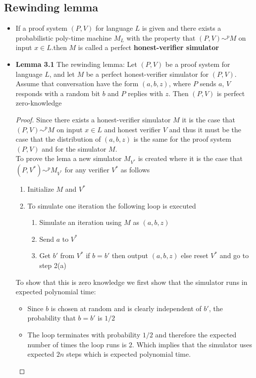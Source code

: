 \subsection{Rewinding lemma}
\begin{itemize}
  \item If a proof system $(P,V)$ for language $L$ is given and there exists a probabilistic poly-time machine $M_{L}$ with the property that $(P,V) \sim^p M$ on input $x \in L$.then $M$ is called a perfect \textbf{honest-verifier simulator}
  \item \textbf{Lemma 3.1} The rewinding lemma: Let $(P,V)$ be a proof system for language $L$, and let $M$ be a perfect honest-verifier simulator for $(P,V)$. Assume that conversation have the form $(a,b,z)$, where $P$ sends $a$, $V$ responds with a random bit $b$ and $P$ replies with $z$. Then $(P,V)$ is perfect zero-knowledge	
  \begin{proof} 
    Since there exists a honest-verifier simulator $M$ it is the case that $(P,V) \sim^p M$ on input $x \in L$ and honest verifier $V$ and thus it must be the case that the distribution of $(a,b,z)$ is the same for the proof system $(P,V)$ and for the simulator $M$. \smallskip \\
    To prove the lema a new simulator $M_{V^*}$ is created where it is the case that $(P,V^*) \sim^p M_{V^*}$ for any verifier $V^*$ as follows
    \begin{enumerate}
      \item Initialize $M$ and $V^*$
      \item To simulate one iteration the following loop is executed 
      \begin{enumerate}
        \item Simulate an iteration using $M$ as $(a,b,z)$ 
        \item Send $a$ to $V^*$
        \item Get $b'$ from $V^*$ if $b=b'$ then output $(a,b,z)$ else reset $V^*$ and go to step 2(a)
      \end{enumerate}
    \end{enumerate}
    To show that this is zero knowledge we first show that the simulator runs in expected polynomial time: 
    \begin{itemize}
    	\item Since $b$ is chosen at random and is clearly independent of $b'$, the probability that $b=b'$ is $1/2$
       \item The loop terminates with probability $1/2$ and therefore the expected number of times the loop runs is $2$. Which implies that the simulator uses expected $2n$ steps which is expected polynomial time.

\end{itemize}
\end{proof}
\end{itemize}
